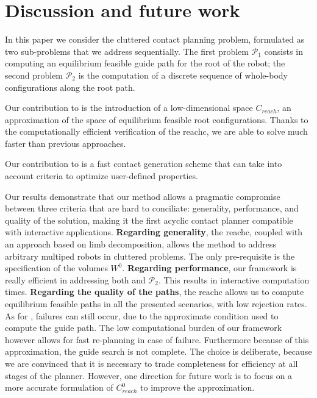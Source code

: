  \section{Discussion and future work} 
\label{sec:conclusion}

In this paper we consider the \gls{cluttered} contact planning problem, formulated as two sub-problems that we address sequentially.
The first problem $\mathcal{P}_1$ consists in computing an \gls{equilibrium feasible} guide path for the root of the robot;
 the second problem $\mathcal{P}_2$ is the computation of a discrete sequence of whole-body configurations along the root path.

Our contribution to \Pa is the introduction of a low-dimensional space $C_{reach}$, an approximation of the space of \gls{equilibrium feasible} root configurations.
Thanks to the computationally efficient verification of the \gls{reachc}, we are able to solve \Pa much faster than previous approaches.

Our contribution to \Pb is a fast contact generation scheme that can take into
account criteria to optimize user-defined properties.

Our results demonstrate that our method allows a pragmatic compromise between three 
criteria that are hard to conciliate: generality, performance, and quality of the solution, making it the first acyclic contact
planner compatible with \gls{interactive} applications.
%
\textbf{Regarding generality}, the \gls{reachc}, coupled with an approach based on limb decomposition, 
allows the method to address arbitrary multiped robots in \gls{cluttered} problems. The only pre-requisite is the specification 
of the volumes $W^0$.
%
\textbf{Regarding performance}, our framework is really efficient in addressing both \Pa and $\mathcal{P}_2$. This results in \gls{interactive} computation times.
%
\textbf{Regarding the quality of the paths}, the \gls{reachc} allows us to compute
\gls{equilibrium feasible} paths in all the presented scenarios, with low rejection rates.
As for \cite{Bouyarmane2009}, failures can still occur, due to the approximate condition used to compute the guide path.
The low computational burden of our framework however allows for fast re-planning in case of failure.
Furthermore because of this approximation, the guide search is not complete. The choice is deliberate, because we are convinced
that it is necessary to trade completeness for efficiency at all stages of the planner.
However, one direction for future work is to focus on a more accurate formulation of $C_{reach}^0$ to improve
the approximation.

